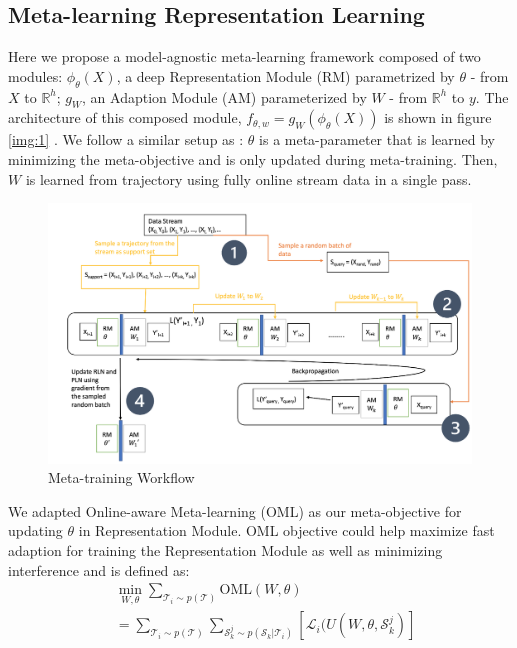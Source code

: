 \subsection{Meta-learning Representation Learning}
\label{sec:mlr}
Here we propose a model-agnostic meta-learning framework composed of two modules: $\phi_\theta(X)$, a deep Representation Module (RM) parametrized by $\theta$ - from $X$ to $\mathbb{R} ^ {h}$; $g_W$, an Adaption Module (AM) parameterized by $W$ - from $\mathbb{R} ^ {h}$ to $y$. The architecture of this composed module, $f_{\theta, w} = g_W(\phi_\theta(X))$ is shown in figure \ref{img:1} . We follow a similar setup as \citep{javed2019meta}: $\theta$ is a meta-parameter that is learned by minimizing the meta-objective and is only updated during meta-training. Then, $W$ is learned from trajectory using fully online stream data in a single pass.
\begin{figure}[ht]
\centering
    \includegraphics[scale=0.6]{imgs/meta-training.png}
    \caption{Meta-training Workflow}
    \label{img:2}
\end{figure}

We adapted Online-aware Meta-learning (OML) as our meta-objective for updating $\theta$ in Representation Module. OML objective could help maximize fast adaption for training the Representation Module as well as minimizing interference and is defined as:
\begin{equation}
    \begin{split}
       &\min_{W, \theta} \sum_{\mathcal{T}_i \sim p(\mathcal{T})} \mathrm{OML}(W, \theta) \\
       &= \sum_{\mathcal{T}_i \sim p(\mathcal{T})} \sum_{\mathcal{S}_k ^ j \sim p(\mathcal{S}_k | \mathcal{T}_i)} [\mathcal{L}_i (U(W, \theta, \mathcal{S}_k ^ j)]
   \end{split}
\end{equation}

